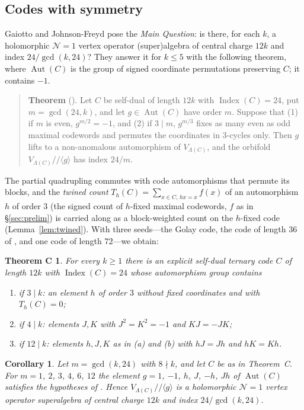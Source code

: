 \documentclass[11pt]{amsart}
\newtheorem*{thmC}{Theorem C}
\newtheorem*{corC}{Corollary}
\theoremstyle{definition}
\newcommand{\Index}{\operatorname{Index}}
\newcommand{\Aut}{\operatorname{Aut}}
\begin{document}
\subsection*{Codes with symmetry}
Gaiotto and Johnson-Freyd pose the \emph{Main Question}: is there, for each $k$, a holomorphic
$\mathcal N=1$ vertex operator (super)algebra of central charge $12k$ and index $24/\gcd(k,24)$?
They answer it for $k\le5$ with the following theorem, where $\Aut(C)$ is the group of signed
coordinate permutations preserving $C$; it contains $-1$.

\begin{quote}
\textbf{Theorem} (\cite[Thm.~5.6]{GJF}). Let $C$ be self-dual of length $12k$ with $\Index(C)=24$,
put $m=\gcd(24,k)$, and let $g\in\Aut(C)$ have order $m$. Suppose that (1) if $m$ is even,
$g^{m/2}=-1$, and (2) if $3\mid m$, $g^{m/3}$ fixes as many even as odd maximal codewords and
permutes the coordinates in $3$-cycles only. Then $g$ lifts to a non-anomalous automorphism of
$V_{\Lambda(C)}$, and the orbifold $V_{\Lambda(C)}/\!\!/\langle g\rangle$ has index $24/m$.
\end{quote}

The partial quadrupling commutes with code automorphisms that permute its blocks, and the
\emph{twined count} $T_h(C)=\sum_{x\in C,\,hx=x}f(x)$ of an automorphism $h$ of order $3$ (the
signed count of $h$-fixed maximal codewords, $f$ as in \S\ref{sec:prelim}) is carried along as a
block-weighted count on the $h$-fixed code (Lemma~\ref{lem:twined}). With three seeds---the Golay
code, the code of length $36$ of \cite[Ex.~5.7]{GJF}, and one code of length $72$---we obtain:

\begin{thmC}
For every $k\ge1$ there is an explicit self-dual ternary code $C$ of length $12k$ with
$\Index(C)=24$ whose automorphism group contains
\begin{enumerate}
\item[(a)] if $3\mid k$: an element $h$ of order $3$ without fixed coordinates and with $T_h(C)=0$;
\item[(b)] if $4\mid k$: elements $J,K$ with $J^2=K^2=-1$ and $KJ=-JK$;
\item[(c)] if $12\mid k$: elements $h,J,K$ as in (a) and (b) with $hJ=Jh$ and $hK=Kh$.
\end{enumerate}
\end{thmC}

\begin{corC}
Let $m=\gcd(k,24)$ with $8\nmid k$, and let $C$ be as in Theorem~C. For $m=1$, $2$, $3$, $4$, $6$,
$12$ the element $g=1$, $-1$, $h$, $J$, $-h$, $Jh$ of $\Aut(C)$ satisfies the hypotheses of
\cite[Thm.~5.6]{GJF}. Hence
$V_{\Lambda(C)}/\!\!/\langle g\rangle$ is a holomorphic $\mathcal N=1$ vertex operator
superalgebra of central charge $12k$ and index $24/\gcd(k,24)$.
\end{corC}
\end{document}
